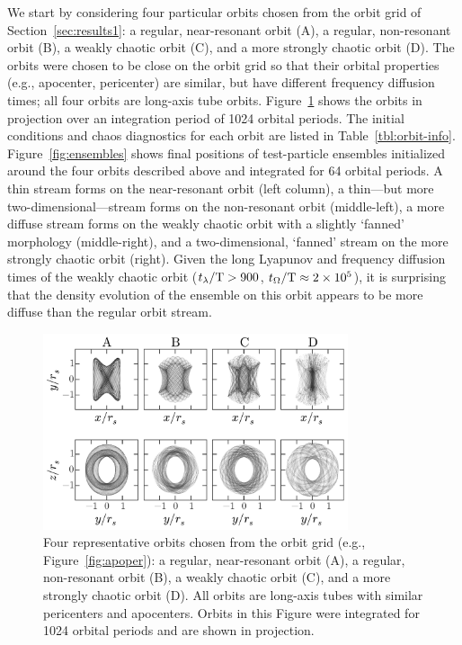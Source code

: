 We start by considering four particular orbits chosen from the orbit grid of
Section~\ref{sec:results1}: a regular, near-resonant orbit (A), a regular,
non-resonant orbit (B), a weakly chaotic orbit (C), and a more strongly chaotic
orbit (D). The orbits were chosen to be close on the orbit grid so that their
orbital properties (e.g., apocenter, pericenter) are similar, but have different
frequency diffusion times; all four orbits are long-axis tube orbits.
Figure~\ref{fig:orbits} shows the orbits in projection over an integration
period of 1024 orbital periods. The initial conditions and chaos diagnostics for
each orbit are listed in Table~\ref{tbl:orbit-info}. Figure~\ref{fig:ensembles}
shows final positions of test-particle ensembles initialized around the four
orbits described above and integrated for 64 orbital periods. A thin stream
forms on the near-resonant orbit (left column), a thin---but more
two-dimensional---stream forms on the non-resonant orbit (middle-left), a more
diffuse stream forms on the weakly chaotic orbit with a slightly `fanned'
morphology (middle-right), and a two-dimensional, `fanned' stream on the more
strongly chaotic orbit (right). Given the long Lyapunov and frequency diffusion
times of the weakly chaotic orbit ($t_\lambda/{\rm T} > 900$,
$t_\Omega/{\rm T} \approx 2\times10^5$), it is surprising that the density
evolution of the ensemble on this orbit appears to be more diffuse than the
regular orbit stream.

\begin{figure}[h]%
\begin{center}
\includegraphics[width=0.8\textwidth]{figures/ch3/four-orbits.pdf}
\caption{Four representative orbits chosen from the orbit grid (e.g.,
Figure~\ref{fig:apoper}): a regular, near-resonant orbit (A), a regular,
non-resonant orbit (B), a weakly chaotic orbit (C), and a more strongly chaotic
orbit (D). All orbits are long-axis tubes with similar pericenters and
apocenters. Orbits in this Figure were integrated for 1024 orbital periods and
are shown in projection.}
\label{fig:orbits}
\end{center}
\end{figure}

